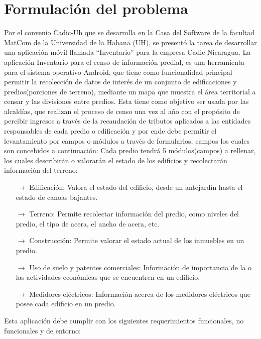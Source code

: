 \section{Formulación del problema}
Por el convenio Cadic-Uh que se desarrolla en la Casa del Software de la facultad
MatCom de la Universidad de la Habana (UH), se presentó la tarea de desarrollar
una aplicación móvil llamada “Inventario” para la empresa Cadic-Nicaragua.
La aplicación Inventario para el censo de información predial, es una herramienta
para el sistema operativo Android, que tiene como funcionalidad principal permitir la
recolección de datos de interés de un conjunto de edificaciones y predios(porciones
de terreno), mediante un mapa que muestra el área territorial a censar y las
divisiones entre predios. Esta tiene como objetivo ser usada por las alcaldías, que
realizan el proceso de censo una vez al año con el propósito de percibir ingresos a
través de la recaudación de tributos aplicados a las entidades responsables de cada
predio o edificación y por ende debe permitir el levantamiento por campos o
módulos a través de formularios, campos los cuales son concebidos a continuación:
Cada predio tendrá 5 módulos(campos) a rellenar, los cuales describirán o valorarán
el estado de los edificios y recolectarán información del terreno:
\begin{itemize}
      \item[$\rightarrow$] Edificación: Valora el estado del edificio, desde un antejardín hasta el
            estado de canoas bajantes.
      \item[$\rightarrow$] Terreno: Permite recolectar información del predio, como niveles del predio,
            el tipo de acera, el ancho de acera, etc.
      \item[$\rightarrow$] Construcción: Permite valorar el estado actual de los inmuebles en un
            predio.
      \item[$\rightarrow$] Uso de suelo y patentes comerciales: Información de importancia de la o
            las actividades económicas que se encuentren en un edificio.
      \item[$\rightarrow$] Medidores eléctricos: Información acerca de los medidores eléctricos que
            posee cada edificio en un predio.
\end{itemize}
Esta aplicación debe cumplir con los siguientes requerimientos funcionales, no
funcionales y de entorno:

